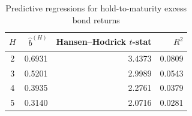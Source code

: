 \begin{table}[htbp]
  \centering
  \caption{Predictive regressions for hold-to-maturity excess bond returns}
  \label{tab:q4b}
  \begin{tabular}{crrr}
    \toprule
    $H$ & $\hat{b}^{(H)}$ & Hansen--Hodrick $t$-stat & $R^2$ \\
    \midrule
    2 & 0.6931 & 3.4373 & 0.0809 \\
    3 & 0.5201 & 2.9989 & 0.0543 \\
    4 & 0.3935 & 2.2761 & 0.0379 \\
    5 & 0.3140 & 2.0716 & 0.0281 \\
    \bottomrule
  \end{tabular}
\end{table}
